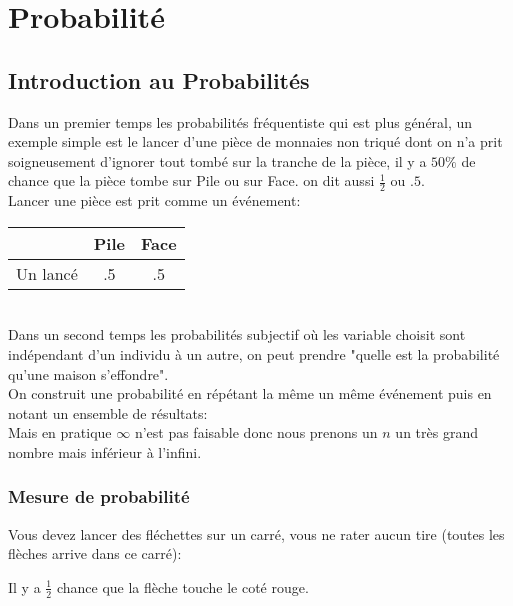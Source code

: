\part{Probabilité}
\pagebreak

\chapter{Introduction au Probabilités}

Dans un premier temps les probabilités fréquentiste qui est plus général, un exemple simple est le lancer d'une pièce de monnaies non triqué dont on n'a prit soigneusement d'ignorer tout tombé sur la tranche de la pièce, il y a $50\%$ de chance que la pièce tombe sur Pile ou sur Face. on dit aussi $\frac{1}{2}$ ou $.5$.\\
Lancer une pièce est prit comme un événement:
\\\vspace{0.8cm}
\begin{tabular}{c|cc}
\hline
$ $ & Pile & Face\\
\hline
Un lancé & .5 & .5\\
\hline
\end{tabular}
\ \\\vspace{0.8cm}
Dans un second temps les probabilités subjectif où les variable choisit sont indépendant d'un individu à un autre, on peut prendre "quelle est la probabilité qu'une maison s'effondre".\\

On construit une probabilité en répétant la même un même événement puis en notant un ensemble de résultats:
\ \\
Mais en pratique $\infty$ n'est pas faisable donc nous prenons un $n$ un très grand nombre mais inférieur à l'infini.\\
\pagebreak

\section{Mesure de probabilité}

Vous devez lancer des fléchettes sur un carré, vous ne rater aucun tire (toutes les flèches arrive dans ce carré):\\

\begin{multicols}{2}
[]
\vspace{0.5cm}
Il y a $\frac{1}{2}$ chance que la flèche touche le coté rouge.
\end{multicols}

